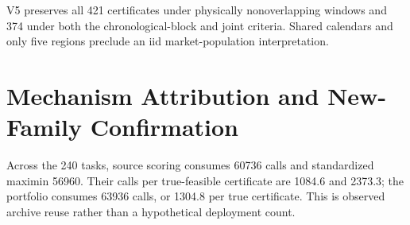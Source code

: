 V5 preserves all 421 certificates under physically nonoverlapping
windows and 374 under both the chronological-block and joint criteria.  Shared calendars and only
five regions preclude an iid market-population interpretation.

\FloatBarrier
\section{Mechanism Attribution and New-Family Confirmation}

\begin{table}[htbp]
\centering\small
\caption{Diagnostic first-center and distance interventions on the original
160 tasks at each grid resolution.  Medoid first centers are fixed across
metrics; raw L2 uses the same public profiles and Voronoi quadrature.}
\resizebox{\textwidth}{!}{}
\end{table}

\begin{table}[htbp]
\centering\small
\caption{Prospective results by source-family and public-library seed.
Each row contains 80 tasks at $d=1000$.}
\resizebox{\textwidth}{!}{}
\end{table}

\begin{table}[htbp]
\centering\small
\caption{Prospective results by fixed mechanism, pooling ten tasks from each
of the three new families.  Each row contains 30 tasks.}
\resizebox{\textwidth}{!}{}
\end{table}

\begin{table}[htbp]
\centering\small
\caption{Predefined library-size sensitivities on the first new family.
Each row contains 80 paired tasks; support composition changes with size.}
\resizebox{\textwidth}{!}{}
\end{table}

\begin{table}[htbp]
\centering\small
\caption{Observed reuse cost in prospective synthetic confirmation.  Each
source design pays once for each of 24 archives serving ten tasks.}
\resizebox{\textwidth}{!}{}
\end{table}

Across the 240 tasks, source scoring consumes 60736 calls and standardized
maximin 56960.  Their calls per true-feasible certificate are 1084.6 and
2373.3; the portfolio consumes 63936 calls, or 1304.8 per true certificate.
This is observed archive reuse rather than a hypothetical deployment count.

